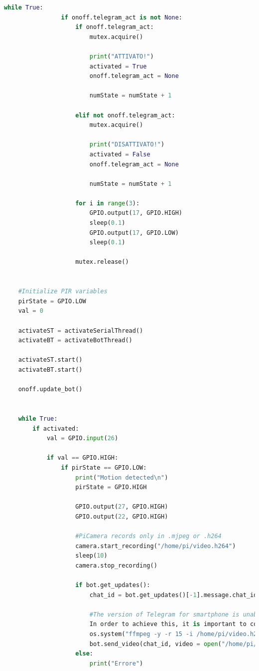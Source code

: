 \documentclass[12pt]{article}
\begin{document}
\begin{lstlisting}[language=Python]
        	while True:
            	if onoff.telegram_act is not None:
                	if onoff.telegram_act:
                    	mutex.acquire()
         
                    	print("ATTIVATO!")
                    	activated = True
                    	onoff.telegram_act = None
               
                    	numState = numState + 1
               
                	elif not onoff.telegram_act:
                    	mutex.acquire()
                   
                   	 	print("DISATTIVATO!")
                    	activated = False
                    	onoff.telegram_act = None
                    
                    	numState = numState + 1
               
                	for i in range(3):
                    	GPIO.output(17, GPIO.HIGH)
                    	sleep(0.1)
                    	GPIO.output(17, GPIO.LOW)
                    	sleep(0.1)
                
                	mutex.release()


	#Initialize PIR variables
	pirState = GPIO.LOW
	val = 0

	activateST = activateSerialThread()
	activateBT = activateBotThread()

	activateST.start()
	activateBT.start()

	onoff.update_bot()


	while True:
    	if activated:
        	val = GPIO.input(26)

        	if val == GPIO.HIGH:
            	if pirState == GPIO.LOW:
                	print("Motion detected\n")
               	 	pirState = GPIO.HIGH
  
                	GPIO.output(27, GPIO.HIGH)
                	GPIO.output(22, GPIO.HIGH)
    
                	#PiCamera records only in .mjpeg or .h264
                	camera.start_recording("/home/pi/video.h264")
                	sleep(10)
                	camera.stop_recording()
        
                	if bot.get_updates():
                    	chat_id = bot.get_updates()[-1].message.chat_id
                   
                    	#The version of Telegram for smartphone is unable to read file .mjpeg or .h264. 
						In order to achieve this, it is important to convert the video file in .mp4
                    	os.system("ffmpeg -y -r 15 -i /home/pi/video.h264 -an -c:v copy /home/pi/video.mp4 > /dev/null 2>&1")
         	           	bot.send_video(chat_id, video = open("/home/pi/video.mp4", 'rb'), supports_streaming = True)
                	else: 
                    	print("Errore")
        

\end{lstlisting}
\end{document}
